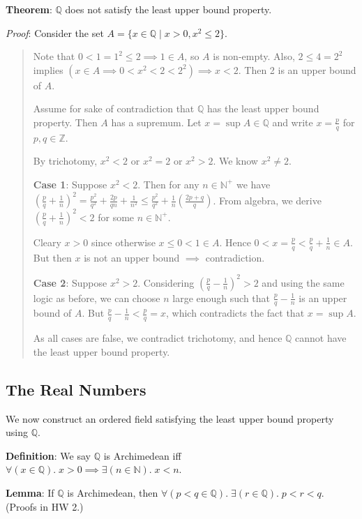 \documentclass[11pt]{article}
\begin{document}
\textbf{Theorem}: $\mathbb{Q}$ does not satisfy the least upper bound property.

\emph{Proof}: Consider the set $A = \{x \in \mathbb{Q} \;|\; x > 0, x^2 \leq 2\}$.
\begin{quote}\vspace{-0.3cm}
Note that $0 < 1 = 1^2 \leq 2 \implies 1 \in A$, so $A$ is non-empty. Also, $2 \leq 4 = 2^2$ implies $(x \in A \implies 0 < x^2 < 2 < 2^2) \implies x < 2$. Then 2 is an upper bound of $A$.

Assume for sake of contradiction that $\mathbb{Q}$ has the least upper bound property. Then $A$ has a supremum. Let $x = \sup A \in \mathbb{Q}$ and write $x = \frac{p}{q}$ for $p,q \in \mathbb{Z}$.

By trichotomy, $x^2 < 2$ or $x^2 = 2$ or $x^2 > 2$. We know $x^2 \neq 2$.

\textbf{Case 1}: Suppose $x^2 < 2$. Then for any $n \in \mathbb{N}^+$ we have $(\frac{p}{q} + \frac{1}{n})^2 = \frac{p^2}{q^2} + \frac{2p}{qn} + \frac{1}{n^2} \leq \frac{p^2}{q^2} + \frac{1}{n}(\frac{2p+q}{q})$. From algebra, we derive $(\frac{p}{q} + \frac{1}{n})^2 < 2$ for some $n \in \mathbb{N}^+$.

Cleary $x > 0$ since otherwise $x \leq 0 < 1 \in A$. Hence $0 < x = \frac{p}{q} < \frac{p}{q} + \frac{1}{n} \in A$. But then $x$ is not an upper bound $\implies$ contradiction.

\textbf{Case 2}: Suppose $x^2 > 2$. Considering $(\frac{p}{q} - \frac{1}{n})^2 > 2$ and using the same logic as before, we can choose $n$ large enough such that $\frac{p}{q} - \frac{1}{n}$ is an upper bound of $A$. But $\frac{p}{q} - \frac{1}{n} < \frac{p}{q} = x$, which contradicts the fact that $x = \sup A$.

As all cases are false, we contradict trichotomy, and hence $\mathbb{Q}$ cannot have the least upper bound property.
\end{quote}

\subsection{The Real Numbers}

We now construct an ordered field satisfying the least upper bound property using $\mathbb{Q}$.

\textbf{Definition}: We say $\mathbb{Q}$ is Archimedean iff $\forall (x \in \mathbb{Q}).\; x > 0 \implies \exists (n \in \mathbb{N}).\; x < n$.

\textbf{Lemma}: If $\mathbb{Q}$ is Archimedean, then $\forall (p < q \in \mathbb{Q}).\; \exists (r \in \mathbb{Q}).\; p < r < q$.\\
(Proofs in HW 2.)
\end{document}
